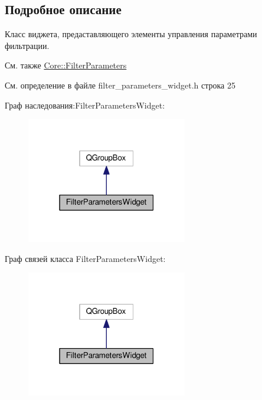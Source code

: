 \subsection{Подробное описание}
Класс виджета, предаставляющего элементы управления параметрами фильтрации. 

\begin{DoxySeeAlso}{См. также}
\hyperlink{class_core_1_1_filter_parameters}{Core\+::\+Filter\+Parameters} 
\end{DoxySeeAlso}


См. определение в файле filter\+\_\+parameters\+\_\+widget.\+h строка 25



Граф наследования\+:Filter\+Parameters\+Widget\+:
\nopagebreak
\begin{figure}[H]
\begin{center}
\leavevmode
\includegraphics[width=199pt]{class_filter_parameters_widget__inherit__graph}
\end{center}
\end{figure}


Граф связей класса Filter\+Parameters\+Widget\+:
\nopagebreak
\begin{figure}[H]
\begin{center}
\leavevmode
\includegraphics[width=199pt]{class_filter_parameters_widget__coll__graph}
\end{center}
\end{figure}


